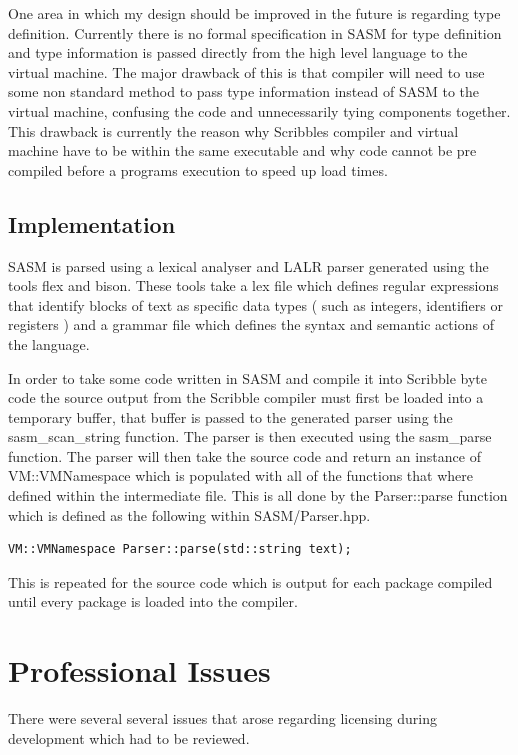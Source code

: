 \documentclass[]{final_report}
\begin{document}
One area in which my design should be improved in the future is regarding type definition. Currently there is no formal specification in SASM for type definition and type information is passed directly from the high level language to the virtual machine. The major drawback of this is that compiler will need to use some non standard method to pass type information instead of SASM to the virtual machine, confusing the code and unnecessarily tying components together. This drawback is currently the reason why Scribbles compiler and virtual machine have to be within the same executable and why code cannot be pre compiled before a programs execution to speed up load times.

\section{Implementation}

SASM is parsed using a lexical analyser and LALR parser generated using the tools flex and bison. These tools take a lex file which defines regular expressions that identify blocks of text as specific data types ( such as integers, identifiers or registers ) and a grammar file which defines the syntax and semantic actions of the language.

In order to take some code written in SASM and compile it into Scribble byte code the source output from the Scribble compiler must first be loaded into a temporary buffer, that buffer is passed to the generated parser using the sasm\_scan\_string function. The parser is then executed using the sasm\_parse function. The parser will then take the source code and return an instance of VM::VMNamespace which is populated with all of the functions that where defined within the intermediate file. This is all done by the Parser::parse function which is defined as the following within SASM/Parser.hpp.

\begin{verbatim}
VM::VMNamespace Parser::parse(std::string text);
\end{verbatim}

This is repeated for the source code which is output for each package compiled until every package is loaded into the compiler.

\chapter{Professional Issues}

There were several several issues that arose regarding licensing during development which had to be reviewed.
\end{document}

